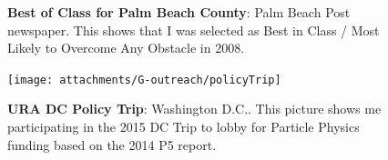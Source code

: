 \begin{figure}[h!]
	\centering
	\caption{\textbf{Best of Class for Palm Beach County}: Palm Beach Post newspaper. This shows that I was selected as Best in Class / Most Likely to Overcome Any Obstacle in 2008.}
	\hspace{1em}
\end{figure}

\begin{figure}[h!]
	\centering
	\caption{\textbf{URA DC Policy Trip}: Washington D.C.. This picture shows me participating in the 2015 DC Trip to lobby for Particle Physics funding based on the 2014 P5 report.}
	\texttt{[image: attachments/G-outreach/policyTrip]}
\end{figure}

